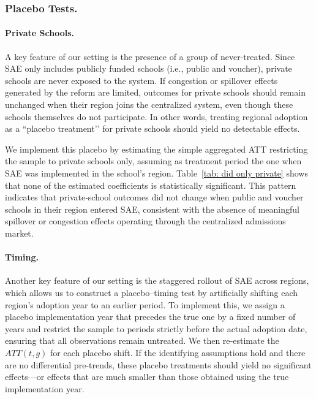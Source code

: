


\subsubsection{Placebo Tests.}\label{sec: placebo}

\paragraph{Private Schools.} A key feature of our setting is the presence of a group of never‑treated.  Since SAE only includes publicly funded schools (i.e., public and voucher), private schools are never exposed to the system. If congestion or spillover effects generated by the reform are limited, outcomes for private schools should remain unchanged when their region joins the centralized system, even though these schools themselves do not participate. In other words, treating regional adoption as a “placebo treatment’’ for private schools should yield no detectable effects.

We implement this placebo by estimating the simple aggregated ATT restricting the sample to private schools only, assuming as treatment period the one when SAE was implemented in the school's region. Table~\ref{tab: did only private} shows that none of the estimated coefficients is statistically significant. This pattern indicates that private‑school outcomes did not change when public and voucher schools in their region entered SAE, consistent with the absence of meaningful spillover or congestion effects operating through the centralized admissions market.



\paragraph{Timing.} 

Another key feature of our setting is the staggered rollout of SAE across regions, which allows us to construct a placebo–timing test by artificially shifting each region's adoption year to an earlier period.
To implement this, we assign a placebo implementation year that precedes the true one by a fixed number of years and restrict the sample to periods strictly before the actual adoption date, ensuring that all observations remain untreated. We then re‑estimate the $ATT(t,g)$ for each placebo shift. If the identifying assumptions hold and there are no differential pre‑trends, these placebo treatments should yield no significant effects—or effects that are much smaller than those obtained using the true implementation year. 

